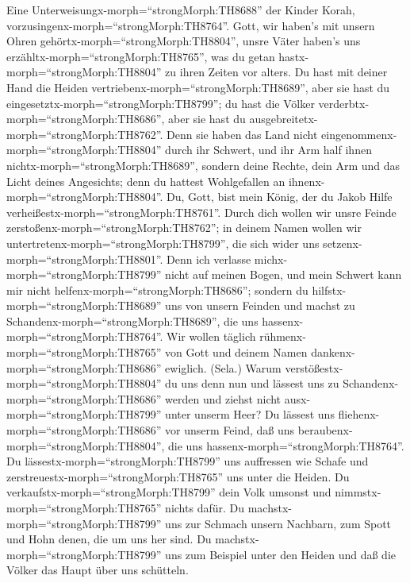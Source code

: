  Eine Unterweisungx-morph=``strongMorph:TH8688'' der Kinder
Korah, vorzusingenx-morph=``strongMorph:TH8764''. Gott, wir haben's mit
unsern Ohren gehörtx-morph=``strongMorph:TH8804'', unsre Väter haben's
uns erzähltx-morph=``strongMorph:TH8765'', was du getan
hastx-morph=``strongMorph:TH8804'' zu ihren Zeiten vor alters.
 Du hast mit deiner Hand die Heiden
vertriebenx-morph=``strongMorph:TH8689'', aber sie hast du
eingesetztx-morph=``strongMorph:TH8799''; du hast die Völker
verderbtx-morph=``strongMorph:TH8686'', aber sie hast du
ausgebreitetx-morph=``strongMorph:TH8762''.  Denn sie haben
das Land nicht eingenommenx-morph=``strongMorph:TH8804'' durch ihr
Schwert, und ihr Arm half ihnen nichtx-morph=``strongMorph:TH8689'',
sondern deine Rechte, dein Arm und das Licht deines Angesichts; denn du
hattest Wohlgefallen an ihnenx-morph=``strongMorph:TH8804''.
 Du, Gott, bist mein König, der du Jakob Hilfe
verheißestx-morph=``strongMorph:TH8761''.  Durch dich wollen
wir unsre Feinde zerstoßenx-morph=``strongMorph:TH8762''; in deinem
Namen wollen wir untertretenx-morph=``strongMorph:TH8799'', die sich
wider uns setzenx-morph=``strongMorph:TH8801''.  Denn ich
verlasse michx-morph=``strongMorph:TH8799'' nicht auf meinen Bogen, und
mein Schwert kann mir nicht helfenx-morph=``strongMorph:TH8686'';
 sondern du hilfstx-morph=``strongMorph:TH8689'' uns von
unsern Feinden und machst zu Schandenx-morph=``strongMorph:TH8689'', die
uns hassenx-morph=``strongMorph:TH8764''.  Wir wollen
täglich rühmenx-morph=``strongMorph:TH8765'' von Gott und deinem Namen
dankenx-morph=``strongMorph:TH8686'' ewiglich. (Sela.) 
Warum verstößestx-morph=``strongMorph:TH8804'' du uns denn nun und
lässest uns zu Schandenx-morph=``strongMorph:TH8686'' werden und ziehst
nicht ausx-morph=``strongMorph:TH8799'' unter unserm Heer? 
Du lässest uns fliehenx-morph=``strongMorph:TH8686'' vor unserm Feind,
daß uns beraubenx-morph=``strongMorph:TH8804'', die uns
hassenx-morph=``strongMorph:TH8764''.  Du
lässestx-morph=``strongMorph:TH8799'' uns auffressen wie Schafe und
zerstreuestx-morph=``strongMorph:TH8765'' uns unter die Heiden.
 Du verkaufstx-morph=``strongMorph:TH8799'' dein Volk
umsonst und nimmstx-morph=``strongMorph:TH8765'' nichts dafür.
 Du machstx-morph=``strongMorph:TH8799'' uns zur Schmach
unsern Nachbarn, zum Spott und Hohn denen, die um uns her sind.
 Du machstx-morph=``strongMorph:TH8799'' uns zum Beispiel
unter den Heiden und daß die Völker das Haupt über uns schütteln.
